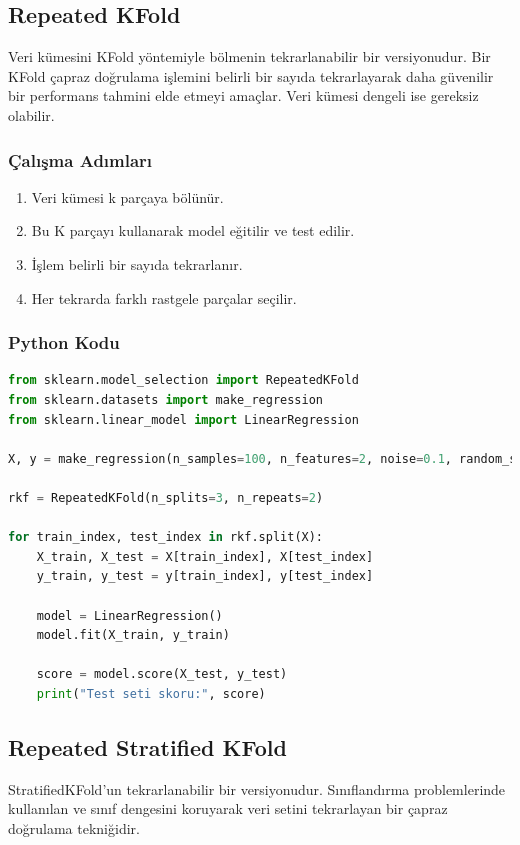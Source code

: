 \newpage

\subsection{Repeated KFold}
Veri kümesini KFold yöntemiyle bölmenin tekrarlanabilir bir versiyonudur. Bir KFold çapraz doğrulama işlemini belirli bir sayıda tekrarlayarak daha güvenilir bir performans tahmini elde etmeyi amaçlar. Veri kümesi dengeli ise gereksiz olabilir.

\subsubsection{Çalışma Adımları}
\begin{enumerate}
    \item Veri kümesi k parçaya bölünür.
    \item Bu K parçayı kullanarak model eğitilir ve test edilir.
    \item İşlem belirli bir sayıda tekrarlanır.
    \item Her tekrarda farklı rastgele parçalar seçilir.
\end{enumerate}

\subsubsection{Python Kodu}

\begin{lstlisting}[language=Python, caption=Scikit-learn'de Repeated KFold örneği.]
from sklearn.model_selection import RepeatedKFold
from sklearn.datasets import make_regression
from sklearn.linear_model import LinearRegression

X, y = make_regression(n_samples=100, n_features=2, noise=0.1, random_state=42)

rkf = RepeatedKFold(n_splits=3, n_repeats=2)

for train_index, test_index in rkf.split(X):
    X_train, X_test = X[train_index], X[test_index]
    y_train, y_test = y[train_index], y[test_index]
    
    model = LinearRegression()
    model.fit(X_train, y_train)
    
    score = model.score(X_test, y_test)
    print("Test seti skoru:", score)
\end{lstlisting}

\newpage

\subsection{Repeated Stratified KFold}
StratifiedKFold'un tekrarlanabilir bir versiyonudur. Sınıflandırma problemlerinde kullanılan ve sınıf dengesini koruyarak veri setini tekrarlayan bir çapraz doğrulama tekniğidir.

